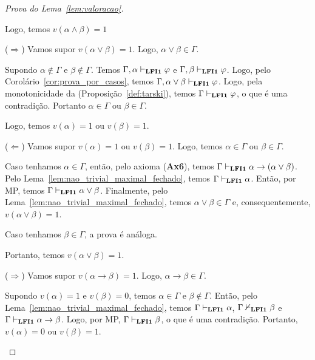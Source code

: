 \begin{proof}[Prova do Lema~\ref{lem:valoracao}]
\begin{provaporcasos}
\begin{adjustwidth}{1cm}{}
                    Logo, temos $v(\alpha \land \beta) = 1$

                \end{adjustwidth}


                \begin{adjustwidth}{1cm}{}
                    \noindent ($\Longrightarrow$) Vamos supor $v(\alpha \lor \beta) = 1$. Logo, $\alpha \lor \beta \in \Gamma$.

                    \noindent Supondo $\alpha \notin \Gamma$ e $\beta \notin \Gamma$. Temos $\Gamma, \alpha \vdash_{{\normalfont\textbf{LFI1}}{}} \varphi$ e $\Gamma, \beta \vdash_{{\normalfont\textbf{LFI1}}{}} \varphi$. Logo, pelo Corolário~\ref{cor:prova_por_casos}, temos $\Gamma, \alpha \lor \beta \vdash_{{\normalfont\textbf{LFI1}}{}} \varphi$. Logo, pela monotonicidade da \lfium{} (Proposição~\ref{def:tarski}), temos $\Gamma \vdash_{{\normalfont\textbf{LFI1}}{}} \varphi$, o que é uma contradição. Portanto $\alpha \in \Gamma$ ou $\beta \in \Gamma$.
                    
                    \noindent Logo, temos $v(\alpha) = 1$ ou $v(\beta) = 1$.

                    \noindent ($\Longleftarrow$) Vamos supor $v(\alpha) = 1$ ou $v(\beta) = 1$. Logo, temos $\alpha \in \Gamma$ ou $\beta \in \Gamma$.

                    \noindent Caso tenhamos $\alpha \in \Gamma$, então, pelo axioma (\textbf{Ax6}), temos $\Gamma \vdash_{{\normalfont\textbf{LFI1}}{}} \alpha \to (\alpha \lor \beta)$. Pelo Lema~\ref{lem:nao_trivial_maximal_fechado}, temos $\Gamma \vdash_{{\normalfont\textbf{LFI1}}{}} \alpha$. Então, por MP, temos $\Gamma \vdash_{{\normalfont\textbf{LFI1}}{}} \alpha \lor \beta$. Finalmente, pelo Lema~\ref{lem:nao_trivial_maximal_fechado}, temos $\alpha \lor \beta \in \Gamma$ e, consequentemente, $v(\alpha \lor \beta) = 1$.

                    \noindent Caso tenhamos $\beta \in \Gamma$, a prova é análoga.

                    \noindent Portanto, temos $v(\alpha \lor \beta) = 1$.

                \end{adjustwidth}


                    \begin{adjustwidth}{1cm}{}
                        
                        \noindent ($\Longrightarrow$) Vamos supor $v(\alpha \to \beta) = 1$. Logo, $\alpha \to \beta \in \Gamma$.

                        \noindent Supondo $v(\alpha) = 1$ e $v(\beta) = 0$, temos $\alpha \in \Gamma$ e $\beta \not \in \Gamma$. Então, pelo Lema~\ref{lem:nao_trivial_maximal_fechado}, temos $\Gamma \vdash_{{\normalfont\textbf{LFI1}}{}} \alpha$, $\Gamma \nvdash_{{\normalfont\textbf{LFI1}}{}} \beta$ e $\Gamma \vdash_{{\normalfont\textbf{LFI1}}{}} \alpha \to \beta$. Logo, por MP, $\Gamma \vdash_{{\normalfont\textbf{LFI1}}{}} \beta$, o que é uma contradição. Portanto, $v(\alpha) = 0$ ou $v(\beta) = 1$.


\end{adjustwidth}
\end{provaporcasos}
\end{proof}
